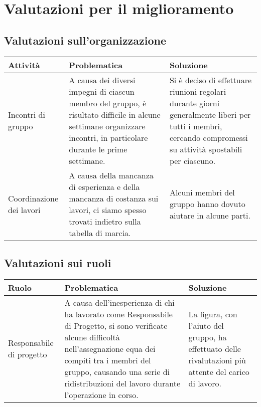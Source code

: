 \chapter{Valutazioni per il miglioramento}\label{valutazioni-per-il-miglioramento}

\section{Valutazioni sull'organizzazione}
\begin{center}
    \begin{xltabular}{\linewidth}{|l|X|X|}
    \hline
    \textbf{Attività} & \textbf{Problematica} & \textbf{Soluzione} \\
    \hline
     Incontri di gruppo & A causa dei diversi impegni di ciascun membro del gruppo, è risultato difficile in alcune settimane organizzare incontri, in particolare durante le prime settimane. & Si è deciso di effettuare riunioni regolari durante giorni generalmente liberi per tutti i membri, cercando compromessi su attività spostabili per ciascuno.\\   
     \hline  
     Coordinazione dei lavori & A causa della mancanza di esperienza e della mancanza di costanza sui lavori, ci siamo spesso trovati indietro sulla tabella di marcia. & Alcuni membri del gruppo hanno dovuto aiutare in alcune parti. \\ 
     \hline
    \end{xltabular}
\end{center}

\section{Valutazioni sui ruoli}
\begin{center}
    \begin{xltabular}{\linewidth}{|l|X|X|}
    \hline
    \textbf{Ruolo} & \textbf{Problematica} & \textbf{Soluzione} \\
    \hline
    Responsabile di progetto & A causa dell'inesperienza di chi ha lavorato come Responsabile di Progetto, si sono verificate alcune difficoltà nell'assegnazione equa dei compiti tra i membri del gruppo, causando una serie di ridistribuzioni del lavoro durante l'operazione in corso. & La figura, con l'aiuto del gruppo, ha effettuato delle rivalutazioni più attente del carico di lavoro. \\
     \hline

    \hline

   \end{xltabular}
\end{center}

